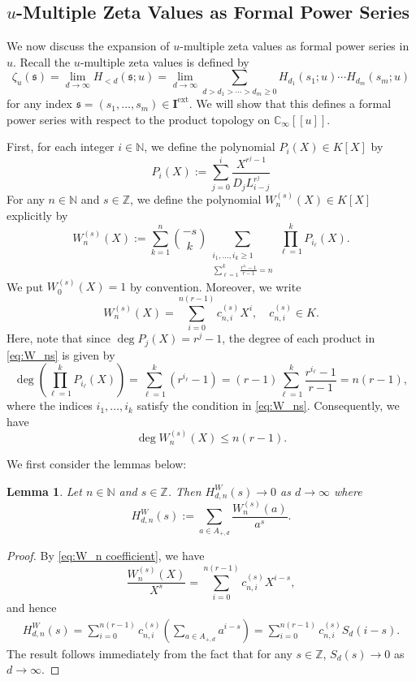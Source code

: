 \documentclass[12pt,reqno]{amsart}
\numberwithin{equation}{section}
\theoremstyle{plain}
\newtheorem{lem}[thm]{Lemma}
\theoremstyle{definition}
\theoremstyle{remark}
\newcommand{\ZZ}{\mathbb{Z}}
\newcommand{\NN}{\mathbb{N}}
\newcommand{\CC}{\mathbb{C}}
\newcommand{\mbb}[1]{[\![{#1}]\!]}
\newcommand{\ww}[1]{\mathfrak{#1}}
\newcommand{\Ical}{\mathbf{I}}
\newcommand{\ext}{\mathrm{ext}}
\begin{document}
\subsection{\texorpdfstring{$u$}{u}-Multiple Zeta Values as Formal Power Series}\label{section:4.2}
We now discuss the expansion of $u$-multiple zeta values as formal power series in $u$. Recall the $u$-multiple zeta values is defined by 
\begin{equation*}
    \zeta_u(\ww{s})=\lim_{d\to\infty}H_{<d}(\ww{s};u)=\lim_{d\to\infty}\sum_{d>d_1>\cdots>d_m\geq 0}H_{d_1}(s_1;u)\cdots H_{d_m}(s_m;u)
\end{equation*}
for any index $\ww{s}=(s_1,\ldots,s_m)\in\Ical^{\ext}$.
We will show that this defines a formal power series with respect to the product topology on $\CC_\infty\mbb{u}$. 

First, for each integer $i \in \NN$, we define the polynomial $P_i(X) \in K[X]$ by 
$$P_i(X) := \sum_{j=0}^i \frac{X^{r^j-1}}{D_j L_{i-j}^{r^j}}$$
For any $n \in \NN$ and $s\in\ZZ$, we define the polynomial $W_n^{(s)}(X) \in K[X]$ explicitly by 
\begin{equation}\label{eq:W_ns}
W_n^{(s)}(X) := \sum_{k=1}^n \binom{-s}{k} \sum_{\substack{i_1, \dots, i_k \ge 1 \\ \sum_{\ell=1}^k \frac{r^{i_\ell}-1}{r-1} = n}} \prod_{\ell=1}^k P_{i_\ell}(X).    
\end{equation}
We put $W_0^{(s)}(X) = 1$ by convention. Moreover, we write
\begin{equation}\label{eq:W_n coefficient}
    W_{n}^{(s)}(X)=\sum_{i=0}^{n(r-1)}c_{n,i}^{(s)}X^{i},\quad c_{n,i}^{(s)}\in K.
\end{equation}
Here, note that since $\deg P_j(X) = r^j - 1$, the degree of each product in \eqref{eq:W_ns} is given by
$$\deg \left( \prod_{\ell=1}^k P_{i_\ell}(X) \right) = \sum_{\ell=1}^k (r^{i_\ell} - 1) = (r-1) \sum_{\ell=1}^k \frac{r^{i_\ell}-1}{r-1} = n(r-1),$$
where the indices $i_1, \dots, i_k$ satisfy the condition in \eqref{eq:W_ns}. Consequently, we have $$\deg W_n^{(s)}(X) \leq n(r-1).$$

We first consider the lemmas below:

\begin{lem}\label{lem:convergence_W}
Let $n\in \NN$ and $s\in\ZZ$. Then
$ H^W_{d,n}(s) \to 0$ as $d\to\infty$
where $$H^W_{d,n}(s) := \sum_{a \in A_{+,d}} \frac{W_n^{(s)}(a)}{a^s}.$$
\end{lem}
\begin{proof}
By \eqref{eq:W_n coefficient}, we have $$\frac{W_n^{(s)}(X)}{X^s} = \sum_{i=0}^{n(r-1)} c_{n,i}^{(s)} X^{i-s},$$ 
and hence 
\begin{align*}
H^W_{d,n}(s) = \sum_{i=0}^{n(r-1)} c_{n,i}^{(s)} \left( \sum_{a \in A_{+,d}} a^{i-s} \right) =\sum_{i=0}^{n(r-1)} c_{n,i}^{(s)}  S_d(i-s).
\end{align*}
The result follows immediately from the fact that for any $s\in\ZZ$, $S_d(s)\to 0$ as $d\to\infty$. 
\end{proof}
\end{document}
